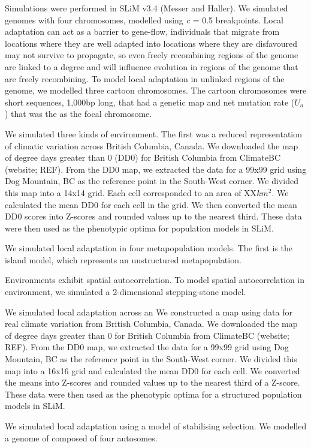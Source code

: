 \documentclass[11pt,twoside,lineno]{GSA_format}
\begin{document}
Simulations were performed in SLiM v3.4 (Messer and Haller). 
We simulated genomes with four chromosomes, modelled using \textit{c} = 0.5 breakpoints. 
Local adaptation can act as a barrier to gene-flow, individuals that migrate from locations where they are well adapted into locations where they are disfavoured may not survive to propagate, so even freely recombining regions of the genome are linked to a degree and will influence evolution in regions of the genome that are freely recombining. To model local adaptation in unlinked regions of the genome, we modelled three cartoon chromosomes. The cartoon chromosomes were short sequences, 1,000bp long, that had a genetic map and net mutation rate (\textit{$U_a$}) that was the as the focal chromosome. 

We simulated three kinds of environment. The first was a reduced representation of climatic variation across British Columbia, Canada. We downloaded the map of degree days greater than 0 (DD0) for British Columbia from ClimateBC (website; REF). From the DD0 map, we extracted the data for a 99x99 grid using Dog Mountain, BC as the reference point in the South-West corner. We divided this map into a 14x14 grid. Each cell corresponded to an area of XX$km^2$. We calculated the mean DD0 for each cell in the grid. We then converted the mean DD0 scores into Z-scores and rounded values up to the nearest third. These data were then used as the phenotypic optima for population models in SLiM.

We simulated local adaptation in four metapopulation models. The first is the island model, which represents an unstructured metapopulation. 

Environments exhibit spatial autocorrelation. To model spatial autocorrelation in environment, we simulated a 2-dimensional stepping-stone model. 

We simulated local adaptation across an 
We constructed a map using data for real climate variation from British Columbia, Canada. We downloaded the map of degree days greater than 0 for British Columbia from ClimateBC (website; REF). From the DD0 map, we extracted the data for a 99x99 grid using Dog Mountain, BC as the reference point in the South-West corner. We divided this map into a 16x16 grid and calculated the mean DD0 for each cell. We converted the means into Z-scores and rounded values up to the nearest third of a Z-score. These data were then used as the phenotypic optima for a structured population models in SLiM.

We simulated local adaptation using a model of stabilising selection. We modelled a genome of composed of four autosomes. 
\end{document}
